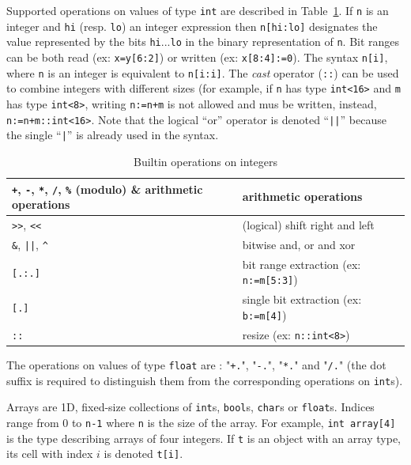 \step Supported operations on values of type \texttt{int} are described in Table~\ref{tab:int-ops}.
If \verb|n| is an integer and \verb|hi| (resp. \verb|lo|) an integer expression then \verb|n[hi:lo]|
designates the value represented by the bits \verb|hi|...\verb|lo| in the binary representation of
\verb|n|. Bit ranges can be both read (ex: \verb|x=y[6:2]|) or written (ex: \verb|x[8:4]:=0|). The
syntax \verb|n[i]|, where \verb|n| is an integer is equivalent to \verb|n[i:i]|. The \emph{cast}
operator (\verb|::|) can be used to combine integers with different sizes (for example, if \verb|n|
has type \verb|int<16>| and \verb|m| has type \verb|int<8>|, writing \verb|n:=n+m| is not allowed
and mus be written, instead, \verb|n:=n+m::int<16>|. Note that the
logical ``or'' operator is denoted ``\verb+||+'' because the single ``\verb+|+'' is already used in
the syntax.

\begin{table}[h]
\begin{center}
\begin{tabular}{|l|l|} \hline
\verb|+|, \verb|-|, \verb|*|, \verb|/|, \verb|%| (modulo) & arithmetic operations \\ \hline 
\verb|>>|, \verb|<<| & (logical) shift right and left \\ \hline 
\verb|&|, \verb+||+, \verb|^| & bitwise and, or and xor \\ \hline 
\verb|[.:.]| & bit range extraction (ex: \verb|n:=m[5:3]|) \\ \hline 
\verb|[.]| & single bit extraction (ex: \verb|b:=m[4]|) \\ \hline 
\verb|::| & resize (ex: \verb|n::int<8>|) \\ \hline 
\end{tabular}
\caption{\label{tab:int-ops}Builtin operations on integers}
\end{center}
\end{table}

\step The operations on values of type \texttt{float} are : "\verb|+.|", "\verb|-.|", "\verb|*.|" and
"\verb|/.|" (the dot suffix is required to distinguish them from the corresponding operations on
\texttt{int}s).


\step Arrays are 1D, fixed-size collections of \verb|int|s, \verb|bool|s, \verb|char|s or \verb|float|s. Indices
range from 0 to \verb|n-1| where \verb|n| is the size of the array. For example,
 \verb|int array[4]| is the type describing arrays of four integers. If \verb|t| is an object
  with an array type, its cell with index $i$ is denoted \verb|t[i]|.


